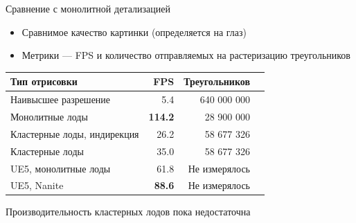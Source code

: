 \begin{frame}{Сравнение с монолитной детализацией}
    \begin{itemize}
        \item Сравнимое качество картинки (определяется на глаз)
        \item Метрики --- FPS и количество отправляемых на растеризацию треугольников
    \end{itemize}

    \begin{center}
        \begin{tabular}{lrrr}
            \hline \hline
            Тип отрисовки & FPS & Треугольников \\ \hline
            Наивысшее разрешение & 5.4 & 640 000 000 \\
            Монолитные лоды & \textbf{114.2} & 28 900 000 \\
            Кластерные лоды, индирекция & 26.2 & 58 677 326 \\
            Кластерные лоды & 35.0 & 58 677 326 \\
            \hline
            UE5, монолитные лоды & 61.8 & Не измерялось \\
            UE5, Nanite & \textbf{88.6} & Не измерялось \\
            \hline \hline
        \end{tabular}
    \end{center}

    \alert{Производительность кластерных лодов пока недостаточна}
\end{frame}

